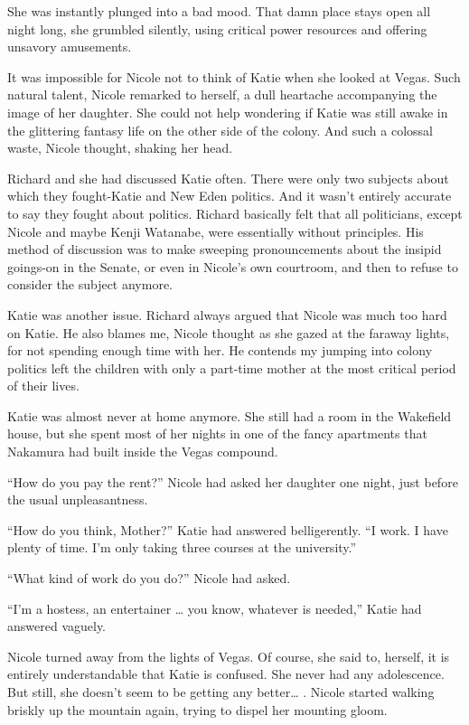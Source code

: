 \documentclass[]{article}
\begin{document}
{She was instantly plunged into a bad mood. That damn place stays open all night long, she grumbled silently, using critical power resources and offering unsavory amusements.

It was impossible for Nicole not to think of Katie when she looked at Vegas. Such natural talent, Nicole remarked to herself, a dull heartache accompanying the image of her daughter. She could not help wondering if Katie was still awake in the glittering fantasy life on the other side of the colony. And such a colossal waste, Nicole thought, shaking her head.

Richard and she had discussed Katie often. There were only two subjects about which they fought-Katie and New Eden politics. And it wasn’t entirely accurate to say they fought about politics. Richard basically felt that all politicians, except Nicole and maybe Kenji Watanabe, were essentially without principles. His method of discussion was to make sweeping pronouncements about the insipid goings-on in the Senate, or even in Nicole’s own courtroom, and then to refuse to consider the subject anymore.

Katie was another issue. Richard always argued that Nicole was much too hard on Katie. He also blames me, Nicole thought as she gazed at the faraway lights, for not spending enough time with her. He contends my jumping into colony politics left the children with only a part-time mother at the most critical period of their lives.

Katie was almost never at home anymore. She still had a room in the Wakefield house, but she spent most of her nights in one of the fancy apartments that Nakamura had built inside the Vegas compound.

“How do you pay the rent?” Nicole had asked her daughter one night, just before the usual unpleasantness.

“How do you think, Mother?” Katie had answered belligerently. “I work. I have plenty of time. I’m only taking three courses at the university.”

“What kind of work do you do?” Nicole had asked.

“I’m a hostess, an entertainer … you know, whatever is needed,” Katie had answered vaguely.

Nicole turned away from the lights of Vegas. Of course, she said to, herself, it is entirely understandable that Katie is confused. She never had any adolescence. But still, she doesn’t seem to be getting any better… . Nicole started walking briskly up the mountain again, trying to dispel her mounting gloom.

}
\end{document}
